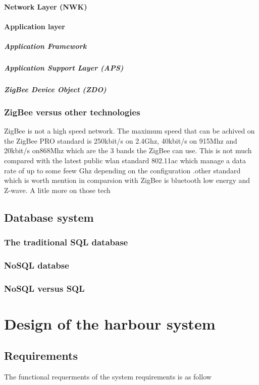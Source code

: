 \documentclass[a4paper,12pt,english]{article}
\begin{document}
\paragraph{Network Layer (NWK)}
\paragraph{Application layer}
\subparagraph{Application Framework}
\subparagraph{Application Support Layer (APS)} \subparagraph{ZigBee Device Object
(ZDO)}
\subsubsection{ZigBee versus other technologies}
ZigBee is not a high speed network. The maximum speed that can be
achived on the ZigBee PRO standard is 250kbit/s on 2.4Ghz, 40kbit/s on 915Mhz and 20kbit/s on868Mhz which are the 3 bands the ZigBee can
use\cite{zigbee}.
This is not much compared with the latest public wlan standard 802.11ac which manage a data rate
of up to some feew Ghz depending on the configuration \cite{802.11ac}.other
standard which is worth mention in comparsion with ZigBee is bluetooth low
energy and Z-wave. A litle more on those tech

\subsection{Database system}
\subsubsection{The traditional SQL database}
\subsubsection{NoSQL databse}
\subsubsection{NoSQL versus SQL}

\section{Design of the harbour system}
\subsection{Requirements}
The functional requerments of the system requirements is as follow
\end{document}

